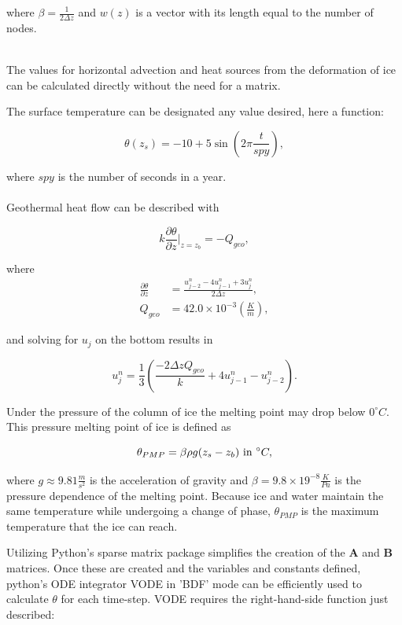 \documentclass{article}%
\begin{document}
where $\beta = \frac{1}{2\Delta z}$ and $w(z)$ is a vector with its length 
\indent equal to the number of nodes.\\
\\
\newpage

\noindent The values for horizontal advection and heat sources from the deformation of ice can be calculated directly without the need for a matrix.  

The surface temperature can be designated any value desired, here a function:

$$\theta(z_s) = -10 + 5 \sin\left(2\pi \frac{t}{spy}\right),$$

where $spy$ is the number of seconds in a year.\\
\\
\noindent Geothermal heat flow can be described with

$$k \frac{\partial \theta}{\partial z} \Bigr\rvert_{z=z_b}= -Q_{geo},$$

where 
\begin{align*} 
  \frac {\partial \theta}{\partial z} &= 
    \frac{u_{j-2}^n - 4u_{j-1}^n + 3u_{j}^n}{2\Delta z},
  \\
  Q_{geo} &= 42.0 \times 10^{-3} \left( \frac Km \right),
\end{align*}

and solving for $u_j$ on the bottom results in

$$u_{j}^n = \frac 13 \left( \frac{-2\Delta z Q_{geo}}{k} + 4u_{j-1}^n - u_{j-2}^n\right).$$

\noindent Under the pressure of the column of ice the melting point may drop below $0^\circ C$.  This pressure melting point of ice is defined as

$$\theta_{PMP} = \beta \rho g (z_s - z_b)\ \textnormal{in }^\circ C,$$

where $g \approx 9.81 \frac {m}{s^2}$ is the acceleration of gravity and $\beta = 9.8 \times 19^{-8} \frac{K}{Pa}$ is the pressure dependence of the melting point.  Because ice and water maintain the same temperature while undergoing a change of phase, $\theta_{PMP}$ is the maximum temperature that the ice can reach.
 
Utilizing Python's sparse matrix package simplifies the creation of the $\mathbf{A}$ and $\mathbf{B}$ matrices.  Once these are created and the variables and constants defined, python's ODE integrator VODE in 'BDF' mode can be efficiently used to calculate $\theta$ for each time-step.  VODE requires the right-hand-side function just described:
\end{document}

